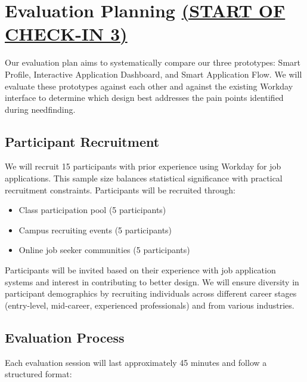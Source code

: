 \documentclass[
	letterpaper, %
]{jdf}
\begin{document}
\newpage


\section{Evaluation Planning \underline{(START OF CHECK-IN 3)}}
Our evaluation plan aims to systematically compare our three prototypes: Smart Profile, Interactive Application Dashboard, and Smart Application Flow. We will evaluate these prototypes against each other and against the existing Workday interface to determine which design best addresses the pain points identified during needfinding.

\subsection{Participant Recruitment}

We will recruit 15 participants with prior experience using Workday for job applications. This sample size balances statistical significance with practical recruitment constraints. Participants will be recruited through:

\begin{itemize}
    \item Class participation pool (5 participants)
    \item Campus recruiting events (5 participants)
    \item Online job seeker communities (5 participants)
\end{itemize}

Participants will be invited based on their experience with job application systems and interest in contributing to better design. We will ensure diversity in participant demographics by recruiting individuals across different career stages (entry-level, mid-career, experienced professionals) and from various industries.

\subsection{Evaluation Process}

Each evaluation session will last approximately 45 minutes and follow a structured format:
\end{document}
